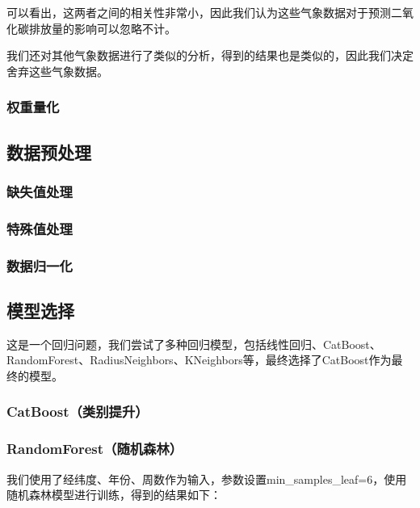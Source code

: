 \documentclass{ctexart}
\begin{document}
可以看出，这两者之间的相关性非常小，因此我们认为这些气象数据对于预测二氧化碳排放量的影响可以忽略不计。

我们还对其他气象数据进行了类似的分析，得到的结果也是类似的，因此我们决定舍弃这些气象数据。

\subsubsection{权重量化}


\subsection{数据预处理}

\subsubsection{缺失值处理}

\subsubsection{特殊值处理}

\subsubsection{数据归一化}

\subsection{模型选择}

这是一个回归问题，我们尝试了多种回归模型，包括线性回归、CatBoost、RandomForest、RadiusNeighbors、KNeighbors等，最终选择了CatBoost作为最终的模型。


\subsubsection{CatBoost（类别提升）}

\subsubsection{RandomForest（随机森林）}

我们使用了经纬度、年份、周数作为输入，参数设置min\_samples\_leaf=6，使用随机森林模型进行训练，得到的结果如下：
\end{document}
